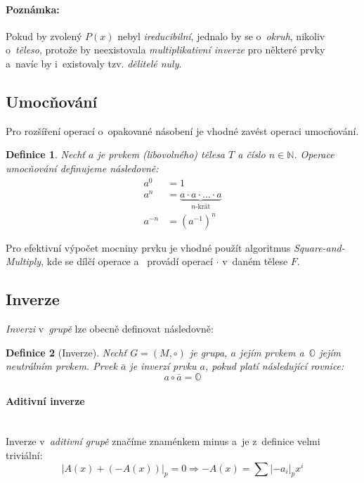 \documentclass[thesis=M,czech,hidelinks]{FITthesis}[2012/06/26]
\newcommand{\0}{{\textcolor[gray]{0.75}{0}}}
\newtheorem{definice}{Definice}
\begin{document}
\paragraph{Poznámka:} Pokud by zvolený $P(x)$ nebyl \emph{ireducibilní}, jednalo
by se o~\emph{okruh}, nikoliv o~\emph{těleso}, protože by neexistovala
\emph{multiplikativní inverze} pro některé prvky a~navíc by i~existovaly tzv.
\emph{dělitelé nuly}.


\subsection{Umocňování}

Pro rozšíření operací o~opakované násobení je vhodné zavést operaci umocňování.

\begin{definice}
    Nechť $a$ je prvkem (libovolného) tělesa $T$ a číslo $n\in\mathbb{N}$. Operace
    umocňování definujeme následovně:
    \begin{align*}
        a^0     &= 1 \\
        a^n     &= \underbrace{a \cdot a \cdot \ldots \cdot a}_{\text{$n$-krát}} \\
        a^{-n}  &= \left(a^{-1}\right)^n
    \end{align*}
\end{definice}

Pro efektivní výpočet mocniny prvku je vhodné použít algoritmus
\emph{Square-and-Multiply}, kde se dílčí operace  a~
provádí operací $\cdot$ v~daném tělese $F$.


\subsection{Inverze}

\emph{Inverzi} v~\emph{grupě} lze obecně definovat následovně:

\begin{definice}[Inverze]
    Nechť $G = (M,\circ)$ je \emph{grupa}, $a$ jejím prvkem a~$\mathbb{O}$ jejím
    neutrálním prvkem. Prvek $\bar{a}$ je \emph{inverzí} prvku $a$, pokud platí
    následující rovnice:
    $$ a \circ \bar{a} = \mathbb{O} $$
\end{definice}

\paragraph{Aditivní inverze} \hfil \\
Inverze v~\emph{aditivní grupě} značíme znaménkem minus \uv{$-$} a~je z~definice
velmi triviální:
$$
    \left| A(x) + (-A(x)) \right|_p = 0 \Rightarrow -A(x) =
    \sum \left|-a_i\right|_p x^i
$$
\end{document}
